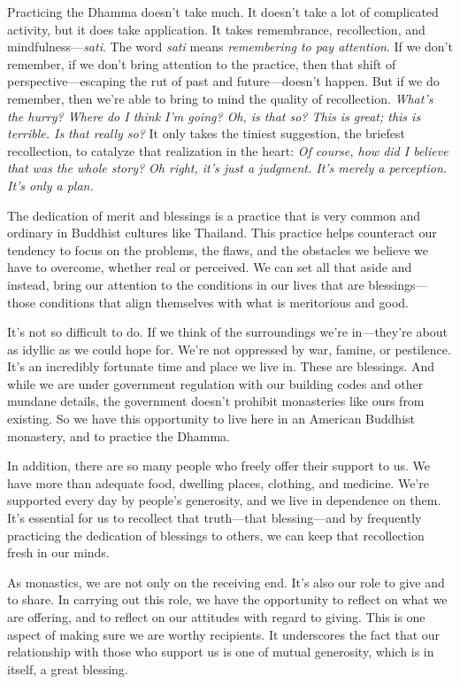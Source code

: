 Practicing the Dhamma doesn't take much. It doesn't take a lot of 
complicated activity, but it does take application. It takes 
remembrance, recollection, and mindfulness---\emph{sati}. The word 
\emph{sati} means \emph{remembering to pay attention}. If we don't 
remember, if we don't bring attention to the practice, then that shift 
of perspective---escaping the rut of past and future---doesn't happen. 
But if we do remember, then we're able to bring to mind the quality of 
recollection. \emph{What's the hurry? Where do I think I'm going? Oh, 
is that so? This is great; this is terrible. Is that really so?} It 
only takes the tiniest suggestion, the briefest recollection, to 
catalyze that realization in the heart: \emph{Of course, how did I 
believe that was the whole story? Oh right, it's just a judgment. It's 
merely a perception. It's only a plan.}


The dedication of merit and blessings is a practice that is very common 
and ordinary in Buddhist cultures like Thailand. This practice helps 
counteract our tendency to focus on the problems, the flaws, and the 
obstacles we believe we have to overcome, whether real or perceived. We 
can set all that aside and instead, bring our attention to the 
conditions in our lives that are blessings---those conditions that 
align themselves with what is meritorious and good.

It's not so difficult to do. If we think of the surroundings we're 
in---they're about as idyllic as we could hope for. We're not oppressed 
by war, famine, or pestilence. It's an incredibly fortunate time and 
place we live in. These are blessings. And while we are under 
government regulation with our building codes and other mundane 
details, the government doesn't prohibit monasteries like ours from 
existing. So we have this opportunity to live here in an American 
Buddhist monastery, and to practice the Dhamma.

In addition, there are so many people who freely offer their support to 
us. We have more than adequate food, dwelling places, clothing, and 
medicine. We're supported every day by people's generosity, and we live 
in dependence on them. It's essential for us to recollect that 
truth---that blessing---and by frequently practicing the dedication of 
blessings to others, we can keep that recollection fresh in our minds.

As monastics, we are not only on the receiving end. It's also our role 
to give and to share. In carrying out this role, we have the 
opportunity to reflect on what we are offering, and to reflect on our 
attitudes with regard to giving. This is one aspect of making sure we 
are worthy recipients. It underscores the fact that our relationship 
with those who support us is one of mutual generosity, which is in 
itself, a great blessing.

